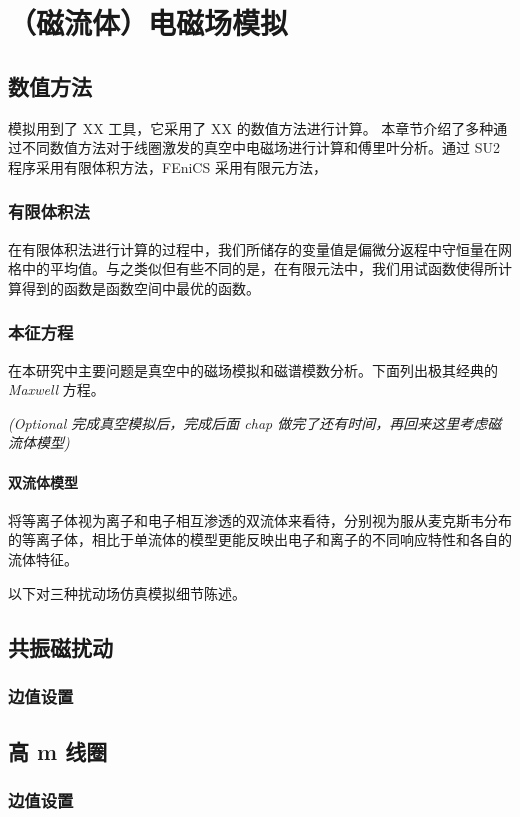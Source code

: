 \chapter{（磁流体）电磁场模拟}

\section{数值方法}
模拟用到了 XX 工具，它采用了 XX 的数值方法进行计算。
本章节介绍了多种通过不同数值方法对于线圈激发的真空中电磁场进行计算和傅里叶分析。通过 SU2 程序采用有限体积方法，FEniCS 采用有限元方法，

\subsection{有限体积法}
在有限体积法进行计算的过程中，我们所储存的变量值是偏微分返程中守恒量在网格中的平均值。与之类似但有些不同的是，在有限元法中，我们用试函数使得所计算得到的函数是函数空间中最优的函数。

\subsection{本征方程}
在本研究中主要问题是真空中的磁场模拟和磁谱模数分析。下面列出极其经典的 \textit{Maxwell} 方程。




\textit{(Optional 完成真空模拟后，完成后面 chap 做完了还有时间，再回来这里考虑磁流体模型)}


\subsubsection{双流体模型}
将等离子体视为离子和电子相互渗透的双流体来看待，分别视为服从麦克斯韦分布的等离子体，相比于单流体的模型更能反映出电子和离子的不同响应特性和各自的流体特征。



以下对三种扰动场仿真模拟细节陈述。
\section{共振磁扰动}
\subsection*{边值设置}

\section{高 m 线圈}
\subsection*{边值设置}

